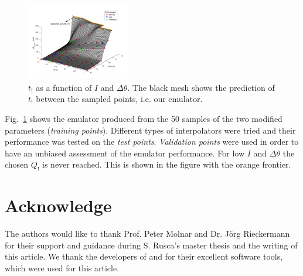 \documentclass[12pt,a4paper,english,twocolumn,fleqn]{narms}
\begin{document}
\begin{figure}[htpb]
  \centering
  \includegraphics[width=0.4\textwidth]{img/emulator.png}
  \caption{$t_!$ as a function of $I$ and $\Delta\theta$.
  The black mesh shows the prediction of $t_!$ between the sampled points, i.e. our emulator.}
  \label{img:emulator}
\end{figure}

Fig.~\ref{img:emulator} shows the emulator produced from the 50 samples of the two modified parameters (\textit{training points}).
Different types of interpolators were tried and their performance was tested on the \textit{test points}.
\textit{Validation points} were used in order to have an unbiased assessment of the emulator performance.
For low $I$ and $\Delta\theta$ the chosen $Q_!$ is never reached. This is shown in the figure with the orange frontier.  


\section{Acknowledge}
The authors would like to thank Prof. Peter Molnar and Dr. Jörg Rieckermann for their support and guidance during S. Rusca's master thesis and the writing of this article.
We thank the developers of  and  for their excellent software tools, which were used for this article.
\end{document}
